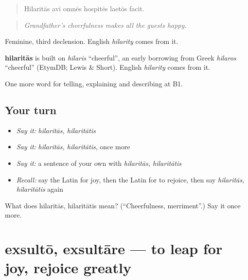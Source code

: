 \begin{quote}
Hilaritās avī omnēs hospitēs laetōs facit.
\end{quote}

\begin{quote}
\emph{Grandfather's cheerfulness makes all the guests happy.}
\end{quote}

Feminine, third declension. English \emph{hilarity} comes from it.

\begin{cousinweb}
\textbf{hilaritās} is built on \emph{hilaris} \textquotedblleft{}cheerful\textquotedblright{}, an early borrowing from Greek \emph{hilaros} \textquotedblleft{}cheerful\textquotedblright{} (EtymDB; Lewis \& Short). English \emph{hilarity} comes from it.
\end{cousinweb}

\begin{grammarlens}[title={What you've built}]
One more word for telling, explaining and describing at B1.
\end{grammarlens}

\subsection*{Your turn}
\begin{itemize}
\raggedright
  \item \emph{Say it:} \emph{hilaritās, hilaritātis}
  \item \emph{Say it:} \emph{hilaritās, hilaritātis}, once more
  \item \emph{Say it:} a sentence of your own with \emph{hilaritās, hilaritātis}
  \item \emph{Recall:} say the Latin for joy, then the Latin for to rejoice, then say \emph{hilaritās, hilaritātis} again
\end{itemize}

\begin{tcolorbox}[breakable,colback=teal!4,colframe=teal!35!black,title={Before you move on}]
What does hilaritās, hilaritātis mean? (\textquotedblleft{}Cheerfulness, merriment\textquotedblright{}.) Say it once more.
\end{tcolorbox}
\section[exsultō, exsultāre]{exsultō, exsultāre — to leap for joy, rejoice greatly}

\label{lesson:LA-C489-exsulto}



